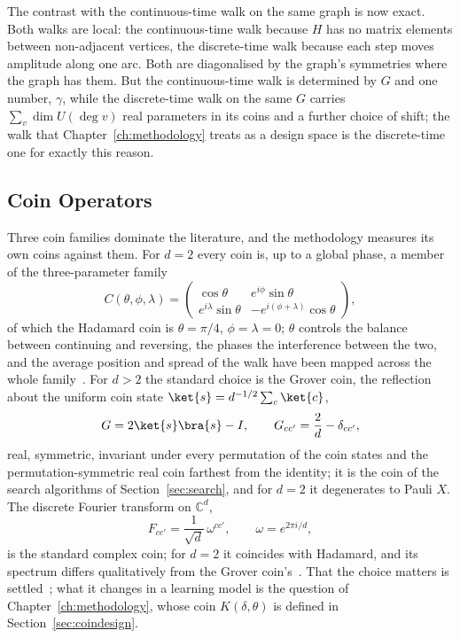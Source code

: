 The contrast with the continuous-time walk on the same graph is now exact.
Both walks are local: the continuous-time walk because $H$ has no matrix
elements between non-adjacent vertices, the discrete-time walk because each
step moves amplitude along one arc. Both are diagonalised by the graph's
symmetries where the graph has them. But the continuous-time walk is
determined by $G$ and one number, $\gamma$, while the discrete-time walk on
the same $G$ carries $\sum_v \dim U(\deg v)$ real parameters in its coins and
a further choice of shift; the walk that Chapter~\ref{ch:methodology} treats
as a design space is the discrete-time one for exactly this reason.

\subsection{Coin Operators}
\label{sec:dtqw-coins}
Three coin families dominate the literature, and the methodology measures
its own coins against them. For $d = 2$ every coin is, up to a global phase,
a member of the three-parameter family
\begin{equation}
	C(\theta, \phi, \lambda) = \begin{pmatrix} \cos\theta & e^{i\phi} \sin\theta \\ e^{i\lambda} \sin\theta & -e^{i(\phi + \lambda)} \cos\theta \end{pmatrix},
	\label{eq:u2coin}
\end{equation}
of which the Hadamard coin is $\theta = \pi/4$, $\phi = \lambda = 0$; $\theta$
controls the balance between continuing and reversing, the phases the
interference between the two, and the average position and spread of the
walk have been mapped across the whole family~\cite{Li_2012, Souza_2013}.
For $d > 2$ the standard choice is the Grover coin, the reflection about the
uniform coin state $\ket{s} = d^{-1/2}\sum_c \ket{c}$,
\begin{equation}
	G = 2\ket{s}\bra{s} - I, \qquad G_{cc'} = \frac{2}{d} - \delta_{cc'} ,
	\label{eq:grovercoin}
\end{equation}
real, symmetric, invariant under every permutation of the coin states and
the permutation-symmetric real coin farthest from the identity; it is the
coin of the search algorithms of Section~\ref{sec:search}, and for $d = 2$ it
degenerates to Pauli $X$. The discrete Fourier transform on $\mathbb{C}^d$,
\begin{equation}
	F_{cc'} = \frac{1}{\sqrt{d}}\, \omega^{c c'}, \qquad \omega = e^{2\pi i / d},
	\label{eq:fouriercoin}
\end{equation}
is the standard complex coin; for $d = 2$ it coincides with Hadamard, and its
spectrum differs qualitatively from the Grover coin's~\cite{Komatsu_2019,
Saito_2018}. That the choice matters is settled~\cite{Tregenna_2003}; what it
changes in a learning model is the question of Chapter~\ref{ch:methodology},
whose coin $K(\delta, \theta)$ is defined in Section~\ref{sec:coindesign}.

